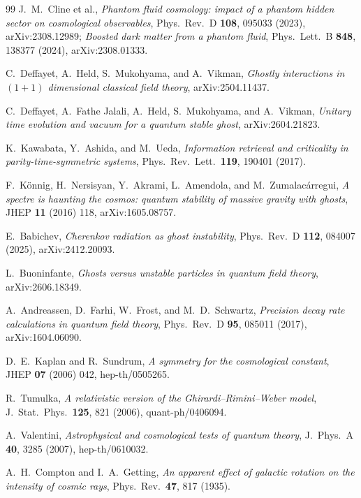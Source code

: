 \documentclass[11pt]{article}
\theoremstyle{definition}
\theoremstyle{remark}
\begin{document}
\begin{thebibliography}{99}
J.~M.~Cline et al.,
\emph{Phantom fluid cosmology: impact of a phantom hidden sector on
cosmological observables},
Phys.\ Rev.\ D \textbf{108}, 095033 (2023), arXiv:2308.12989;
\emph{Boosted dark matter from a phantom fluid},
Phys.\ Lett.\ B \textbf{848}, 138377 (2024), arXiv:2308.01333.

C.~Deffayet, A.~Held, S.~Mukohyama, and A.~Vikman,
\emph{Ghostly interactions in $(1{+}1)$ dimensional classical field
theory},
arXiv:2504.11437.

C.~Deffayet, A.~Fathe Jalali, A.~Held, S.~Mukohyama, and A.~Vikman,
\emph{Unitary time evolution and vacuum for a quantum stable ghost},
arXiv:2604.21823.

K.~Kawabata, Y.~Ashida, and M.~Ueda,
\emph{Information retrieval and criticality in parity-time-symmetric
systems},
Phys.\ Rev.\ Lett.\ \textbf{119}, 190401 (2017).

F.~K\"onnig, H.~Nersisyan, Y.~Akrami, L.~Amendola, and
M.~Zumalac\'arregui,
\emph{A spectre is haunting the cosmos: quantum stability of massive
gravity with ghosts},
JHEP \textbf{11} (2016) 118, arXiv:1605.08757.

E.~Babichev,
\emph{Cherenkov radiation as ghost instability},
Phys.\ Rev.\ D \textbf{112}, 084007 (2025), arXiv:2412.20093.

L.~Buoninfante,
\emph{Ghosts versus unstable particles in quantum field theory},
arXiv:2606.18349.

A.~Andreassen, D.~Farhi, W.~Frost, and M.~D.~Schwartz,
\emph{Precision decay rate calculations in quantum field theory},
Phys.\ Rev.\ D \textbf{95}, 085011 (2017), arXiv:1604.06090.

D.~E.~Kaplan and R.~Sundrum,
\emph{A symmetry for the cosmological constant},
JHEP \textbf{07} (2006) 042, hep-th/0505265.

R.~Tumulka,
\emph{A relativistic version of the Ghirardi--Rimini--Weber model},
J.\ Stat.\ Phys.\ \textbf{125}, 821 (2006), quant-ph/0406094.

A.~Valentini,
\emph{Astrophysical and cosmological tests of quantum theory},
J.\ Phys.\ A \textbf{40}, 3285 (2007), hep-th/0610032.

A.~H.~Compton and I.~A.~Getting,
\emph{An apparent effect of galactic rotation on the intensity of
cosmic rays},
Phys.\ Rev.\ \textbf{47}, 817 (1935).

\end{thebibliography}
\end{document}
